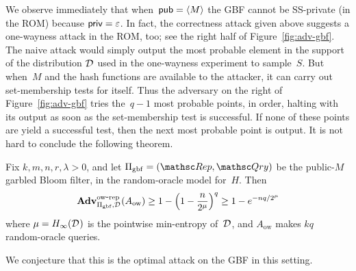 We observe immediately that when~${\sf pub}=\langle M \rangle$ the GBF cannot be SS-private (in the ROM) because ${\sf priv}=\varepsilon$.  In fact, the correctness attack given above suggests a one-wayness attack in the ROM, too; see the right half of Figure~\ref{fig:adv-gbf}.   The naive attack would simply output the most probable element in the support of the distribution $\mathcal{D}_{}^{}$ used in the one-wayness experiment to sample~$S$.  But when~$M$ and the hash functions are available to the attacker, it can carry out set-membership tests for itself.  Thus the adversary on the right of Figure~\ref{fig:adv-gbf} tries the~$q-1$ most probable points, in order, halting with its output as soon as the set-membership test is successful.  If none of these points are yield a successful test, then the next most probable point is output.  It is not hard to conclude the following theorem.

\begin{theorem}
Fix $k,m,n,r,\lambda>0$, and let $\setprim_{\mathrm{gbf}}=(\Rep, \Qry)$ be the public-$M$ garbled Bloom filter, in the random-oracle model for~$H$.  Then %
\[
\mathrm{\mathbf{Adv}}^{\mathrm{ow\mbox{-}rep}}_{\Pi_{\mathrm{gbf}},\mathcal{D}_{}^{}}(A_{\mathrm{ow}}) \geq 1 - \left(1-\frac{n}{2^{\mu}} \right)^{q} \geq 1 - e^{-nq/2^\mu}
\]
 where $\mu = H_\infty(\mathcal{D}_{}^{})$ is the pointwise min-entropy of~$\mathcal{D}_{}^{}$, and $A_{\mathrm{ow}}$ makes $kq$ random-oracle queries.
\end{theorem}
\noindent
We conjecture that this is the optimal attack on the GBF in this setting.

